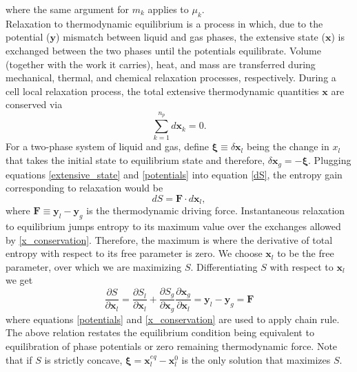 where the same argument for $m_k$ applies to $\mu_k$.\\
Relaxation to thermodynamic equilibrium is a process in which, due to the potential ($\boldsymbol{y}$) mismatch between liquid and gas phases, the extensive state ($\boldsymbol{x}$) is exchanged between the two phases until the potentials equilibrate. Volume (together with the work it carries), heat, and mass are transferred during mechanical, thermal, and chemical relaxation processes, respectively.
During a cell local relaxation process, the total extensive thermodynamic quantities $\boldsymbol{x}$ are conserved via
\begin{equation}\label{x_conservation}
\sum_{k=1}^{n_p} d \boldsymbol{x}_k = 0.
\end{equation}
For a two-phase system of liquid and gas, define $\boldsymbol{\xi} \equiv \delta \boldsymbol{x}_l$ being the change in $x_l$ that takes the initial state to equilibrium state and therefore, $\delta \boldsymbol{x}_g = -\boldsymbol{\xi}$. Plugging equations \eqref{extensive_state} and \eqref{potentials} into equation \eqref{dS}, the entropy gain corresponding to relaxation would be
\begin{equation}\label{dS_F_dx}
d S = \boldsymbol{F} \cdot d\boldsymbol{x}_l,
\end{equation}
where $\boldsymbol{F} \equiv \boldsymbol{y}_l - \boldsymbol{y}_g$ is the thermodynamic driving force. Instantaneous relaxation to equilibrium jumps entropy to its maximum value over the exchanges allowed by \eqref{x_conservation}. Therefore, the maximum is where the derivative of total entropy with respect to its free parameter is zero. We choose $\boldsymbol{x}_l$ to be the free parameter, over which we are maximizing $S$. Differentiating $S$ with respect to $\boldsymbol{x}_l$ we get
\begin{equation}\label{equilibrium_condition}
\frac{\partial S}{\partial \boldsymbol{x}_l} = \frac{\partial S_l}{\partial \boldsymbol{x}_l} + \frac{\partial S_g}{\partial \boldsymbol{x}_g} \frac{\partial \boldsymbol{x}_g}{\partial \boldsymbol{x}_l} = \boldsymbol{y}_l - \boldsymbol{y}_g = \boldsymbol{F}
\end{equation}
where equations \eqref{potentials} and \eqref{x_conservation} are used to apply chain rule. The above relation restates the equilibrium condition being equivalent to equilibration of phase potentials or zero remaining thermodynamic force. Note that if $S$ is strictly concave, $\boldsymbol{\xi} = \boldsymbol{x}_l^{eq} - \boldsymbol{x}_l^{0}$ is the only solution that maximizes $S$.

